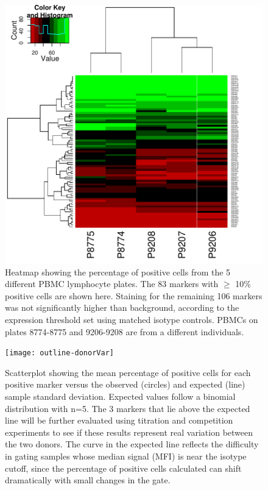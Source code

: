 \documentclass[12pt]{article}
\begin{document}
\begin{figure}
\centering
\includegraphics{outline-pbmcHeat}
\caption{Heatmap showing the percentage of positive cells from the 5 different PBMC lymphocyte plates. The 83 markers
with $\ge$ 10\% positive cells are shown here. Staining for the  remaining 106 markers was not significantly higher
than background, according to the expression threshold set using matched isotype controls. PBMCs on plates 8774-8775 and
9206-9208 are from a different individuals.}
\label{fig:pbmcHeat}
\end{figure}

\begin{figure}
\centering
\texttt{[image: outline-donorVar]}
\caption{Scatterplot showing the mean percentage of positive cells for each positive marker
versus the observed (circles) and expected (line) sample standard deviation. Expected
values follow a binomial distribution with n=5. The 3 markers that lie above the expected line will be 
further evaluated using titration and competition experiments to see if these results represent
real variation between the two donors. The curve in the expected line reflects the difficulty
in gating samples whose median signal (MFI) is near the isotype cutoff, since the percentage of positive 
cells calculated can shift dramatically with small changes in the gate.
}
\label{fig:donorVar}
\end{figure}
\end{document}
